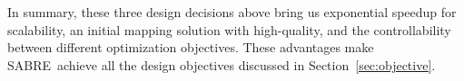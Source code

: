 \documentclass[journal,10pt,twocolumn]{IEEEtran}
\newcommand{\myalgorithmname}{SABRE}
\begin{document}
In summary, these three design decisions above bring us exponential speedup for scalability, an initial mapping solution with high-quality, and the controllability between different optimization objectives. These advantages make \myalgorithmname~achieve all the design objectives discussed in Section~\ref{sec:objective}.%









\end{document}
